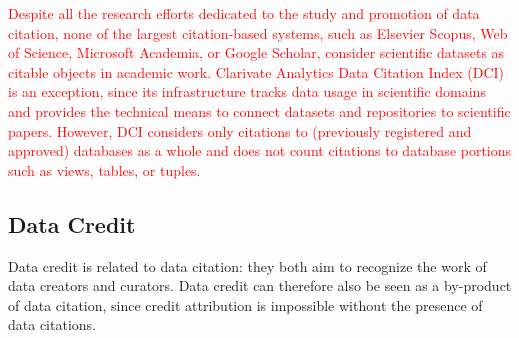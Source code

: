 \textcolor{red}{Despite all the research efforts dedicated to the study and promotion of data citation, none of the largest citation-based systems, such as Elsevier Scopus, Web of Science, Microsoft Academia, or Google Scholar, consider scientific datasets as citable objects in academic work. 
Clarivate Analytics Data Citation Index (DCI) \citep{force2016research} is an exception, since its infrastructure tracks data usage in scientific domains and provides the technical means to connect datasets and repositories to scientific papers. However, DCI considers only citations to (previously registered and approved) databases as a whole and does not count citations to database portions such as views, tables, or tuples.}

%



\subsection{Data Credit}
Data credit is related to data citation: they both aim to recognize the work of data creators and curators. 
Data credit can therefore also be seen as a by-product of data citation, since credit attribution is impossible without the presence of data citations.

